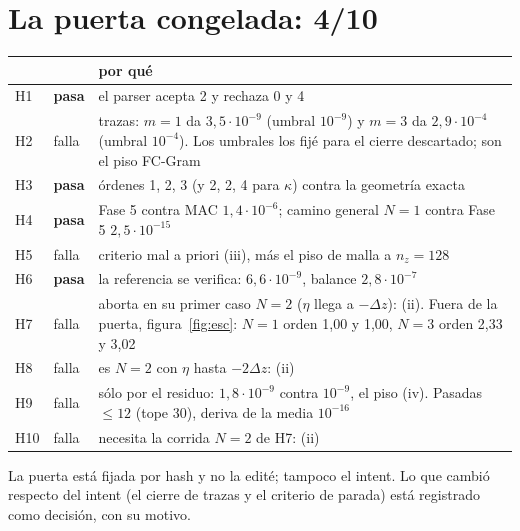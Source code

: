 \documentclass[11pt,a4paper]{article}
\newcommand{\NLunoOrd}{1,00 y 1,00}
\newcommand{\NLtresOrd}{2,33 y 3,02}
\begin{document}
\section{La puerta congelada: 4/10}

\begin{center}\small
\begin{tabular}{@{}llp{11.2cm}@{}}
\toprule
& & por qué\\
\midrule
H1 & \textbf{pasa} & el parser acepta 2 y rechaza 0 y 4\\
H2 & falla & trazas: $m=1$ da $3{,}5\cdot10^{-9}$ (umbral $10^{-9}$) y $m=3$ da $2{,}9\cdot10^{-4}$
(umbral $10^{-4}$). Los umbrales los fijé para el cierre descartado; son el piso FC-Gram\\
H3 & \textbf{pasa} & órdenes 1, 2, 3 (y 2, 2, 4 para $\kappa$) contra la geometría exacta\\
H4 & \textbf{pasa} & Fase 5 contra MAC $1{,}4\cdot10^{-6}$; camino general $N=1$ contra Fase 5 $2{,}5\cdot10^{-15}$\\
H5 & falla & criterio mal a priori (iii), más el piso de malla a $n_z=128$\\
H6 & \textbf{pasa} & la referencia se verifica: $6{,}6\cdot10^{-9}$, balance $2{,}8\cdot10^{-7}$\\
H7 & falla & aborta en su primer caso $N=2$ ($\eta$ llega a $-\Delta z$): (ii). Fuera de la
puerta, figura~\ref{fig:esc}: $N=1$ orden \NLunoOrd, $N=3$ orden \NLtresOrd\\
H8 & falla & es $N=2$ con $\eta$ hasta $-2\Delta z$: (ii)\\
H9 & falla & sólo por el residuo: $1{,}8\cdot10^{-9}$ contra $10^{-9}$, el piso (iv). Pasadas $\le12$ (tope 30), deriva de la media $10^{-16}$\\
H10 & falla & necesita la corrida $N=2$ de H7: (ii)\\
\bottomrule
\end{tabular}
\end{center}
La puerta está fijada por hash y no la edité; tampoco el intent. Lo que cambió respecto del
intent (el cierre de trazas y el criterio de parada) está registrado como decisión, con su
motivo.

\end{document}

